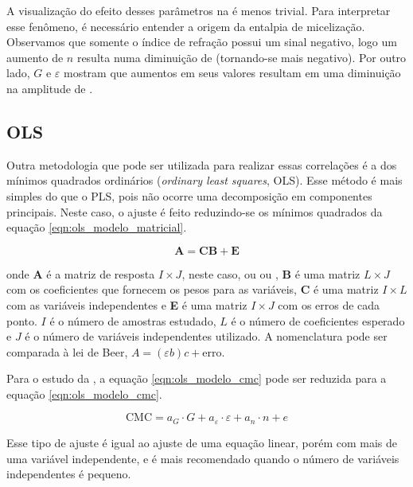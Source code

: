 		A visualização do efeito desses parâmetros na \DHmic é menos trivial. Para interpretar esse fenômeno, é necessário entender a origem da entalpia de micelização. %
		Observamos que somente o índice de refração possui um sinal negativo, logo um aumento de \(n\) resulta numa diminuição de \DHmic{} (tornando-se mais negativo). Por outro lado, \(G\) e \(\varepsilon\) mostram que aumentos em seus valores resultam em uma diminuição na amplitude de \DHmic. 
		
		\FloatBarrier
		\subsection{OLS}
		
		Outra metodologia que pode ser utilizada para realizar essas correlações é a dos mínimos quadrados ordinários (\emph{ordinary least squares}, OLS). Esse método é mais simples do que o PLS, pois não ocorre uma decomposição em componentes principais. Neste caso, o ajuste é feito reduzindo-se os mínimos quadrados da equação \ref{eqn:ols_modelo_matricial}.
	
		\begin{equation}
			\mathbf{A} = \mathbf{CB} + \mathbf{E}
			\label{eqn:ols_modelo_matricial}
		\end{equation}
		
		\noindent onde \textbf{A} é a matriz de resposta \(I \times J\), neste caso, ou \cmc{} ou \DHmic, \textbf{B} é uma matriz \(L \times J\) com os coeficientes que fornecem os pesos para as variáveis, \textbf{C} é uma matriz \(I \times L\) com as variáveis independentes e \textbf{E} é uma matriz \(I \times J\) com os erros de cada ponto. \(I\) é o número de amostras estudado, \(L\) é o número de coeficientes esperado e \(J\) é o número de variáveis independentes utilizado. A nomenclatura pode ser comparada à lei de Beer, \(A = (\varepsilon b)c + \mathrm{erro}\).
		
		Para o estudo da \cmc, a equação \ref{eqn:ols_modelo_cmc} pode ser reduzida para a equação \ref{eqn:ols_modelo_cmc}.
		
		\begin{equation}
		\textrm{CMC} = a_G \cdot G + a_\varepsilon \cdot \varepsilon + a_n \cdot n + e
		\label{eqn:ols_modelo_cmc}
		\end{equation}
		
		Esse tipo de ajuste é igual ao ajuste de uma equação linear, porém com mais de uma variável independente, e é mais recomendado quando o número de variáveis independentes é pequeno.
		
